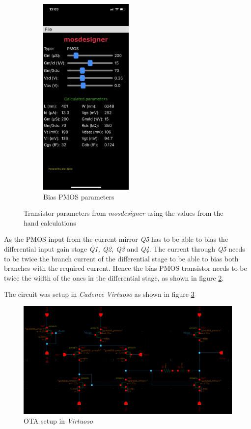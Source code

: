 \begin{figure}[ht]
\begin{subfigure}{.33\textwidth}
        \centering
        \includegraphics[height = 10cm, keepaspectratio]{Images/mosdesigner/PMOS_input_parameters.PNG}
        \caption{Bias PMOS parameters}
        \label{fig:PMOS:bias:param}
    \end{subfigure}
    \caption{Transistor parameters from \textit{mosdesigner} using the values from the hand calculations}
    \label{fig:transistor:param}
\end{figure}

As the PMOS input from the current mirror \textit{Q5} has to be able to bias the differential input gain stage \textit{Q1, Q2, Q3} and \textit{Q4}.  The current through \textit{Q5} needs to be twice the branch current of the differential stage to be able to bias both branches with the required current. Hence the bias PMOS transistor needs to be twice the width of the ones in the differential stage, as shown in figure \ref{fig:transistor:param}.

The circuit was setup in \textit{Cadence Virtuoso} as shown in figure \ref{fig:OTA:sch}
\begin{figure}[!htbp]
    \centering
    \includegraphics[width=.9\linewidth]{Images/Virtuoso/Miller_OTA_Virtuoso_sch.png}
    \caption{OTA setup in \textit{Virtuoso}}
    \label{fig:OTA:sch}
\end{figure}